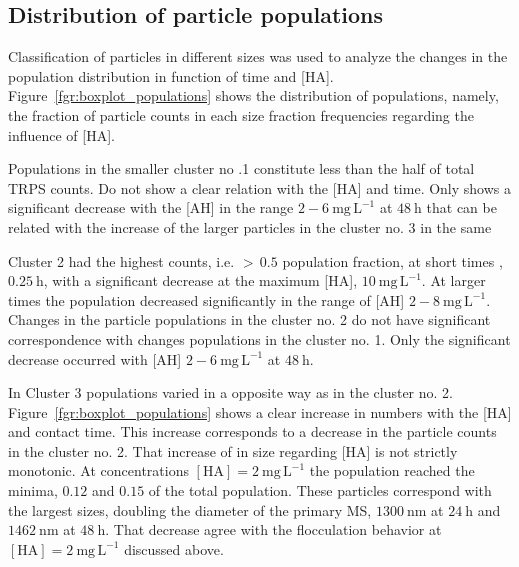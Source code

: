 \documentclass[journal=langd5,manuscript=article]{achemso}
\begin{document}
\subsection{Distribution of particle populations}

Classification of particles in different sizes was used to analyze the changes in the population distribution in function of time and [HA].
Figure~\ref{fgr:boxplot_populations} shows the distribution of populations,
namely, the fraction of particle counts in each size fraction frequencies 
regarding the influence of [HA].

Populations in the smaller cluster no .1 constitute less than the half of total TRPS counts.  Do not show a clear relation with the [HA] and 
time. 
Only  shows a  significant decrease 
with the [AH] in the range $2-6~\mathrm{mg\,L^{-1}}$ 
at 
$48~\mathrm{h}$ that can be related with the increase of the larger particles in the cluster no. 3 in the same 

Cluster 2
had the highest counts, i.e.
$>\,0.5$ population fraction, 
 at short times
,$0.25~\mathrm{h}$,
with a significant decrease at the maximum [HA], 
$10~\mathrm{mg\,L^{-1}}$.
At larger times the population decreased significantly in the range
of [AH] $2-8~\mathrm{mg\,L^{-1}}$.
Changes in the particle populations in the cluster no. 2 do not have
significant correspondence  with changes populations in the cluster no. 1.
Only  the  significant decrease  occurred
with [AH] $2-6~\mathrm{mg\,L^{-1}}$ 
at 
$48~\mathrm{h}$.






In Cluster 3 
populations varied in a opposite way as in the cluster no. 2. Figure~\ref{fgr:boxplot_populations}
shows a clear increase in numbers with the [HA] and contact time.
This increase corresponds to a decrease in the particle counts in the cluster no. 2.
%
That increase of in size regarding [HA] is not strictly monotonic.
 At concentrations 
$\mathrm{[HA]} = 2~\mathrm{mg\,L^{-1}}$ 
the  population reached the  minima, $0.12$ and $0.15$ of the total population. These particles correspond
with the largest sizes, doubling the diameter of the primary MS,  
$1300~\mathrm{nm}$ at
$24~\mathrm{h}$ 
and
$1462~\mathrm{nm}$ at
$48~\mathrm{h}$. 
That decrease agree with the flocculation behavior at 
$\mathrm{[HA]} = 2~\mathrm{mg\,L^{-1}}$ 
discussed above.
\end{document}

